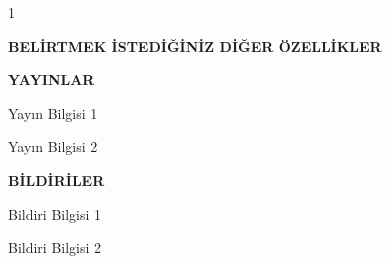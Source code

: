 \documentclass[12pt,oneside]{report}
\begin{document}
\begin{ozgecmis}
\begin{spacing}{1}
			\bigskip \par
			\textbf{BEL\.IRTMEK \.ISTED\.IĞ\.IN\.IZ D\.IĞER ÖZELL\.IKLER}
			\medskip \par

							
			\bigskip \par
			\textbf{YAYINLAR}  
			\medskip \par
                Yayın Bilgisi 1 \par
                Yayın Bilgisi 2 \par
			
			\bigskip \par
			\textbf{BİLDİRİLER}  
			\medskip \par
			Bildiri Bilgisi 1 \par
                Bildiri Bilgisi 2 \par

		\end{spacing}                                  
	\end{ozgecmis} 
\end{document}

